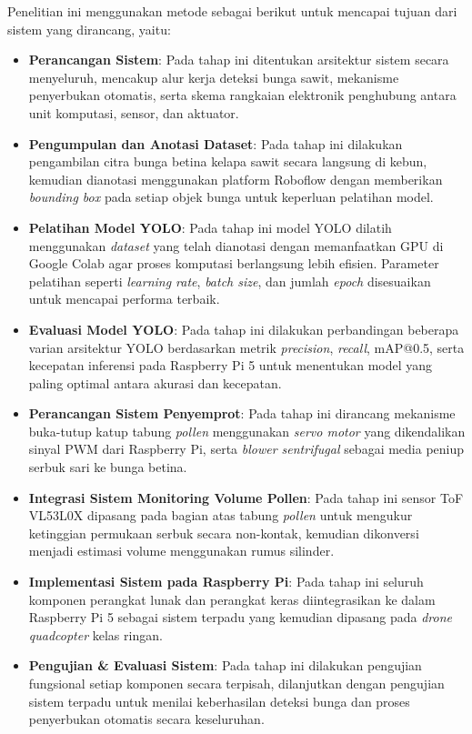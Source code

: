 Penelitian ini menggunakan metode sebagai berikut untuk mencapai tujuan dari sistem
yang dirancang, yaitu:
\begin{itemize}
    \item \textbf{Perancangan Sistem}: Pada tahap ini ditentukan arsitektur sistem secara menyeluruh, mencakup alur kerja deteksi bunga sawit, mekanisme penyerbukan otomatis, serta skema rangkaian elektronik penghubung antara unit komputasi, sensor, dan aktuator.
    \item \textbf{Pengumpulan dan Anotasi Dataset}: Pada tahap ini dilakukan pengambilan citra bunga betina kelapa sawit secara langsung di kebun, kemudian dianotasi menggunakan platform Roboflow dengan memberikan \emph{bounding box} pada setiap objek bunga untuk keperluan pelatihan model.
    \item \textbf{Pelatihan Model YOLO}: Pada tahap ini model YOLO dilatih menggunakan \emph{dataset} yang telah dianotasi dengan memanfaatkan GPU di Google Colab agar proses komputasi berlangsung lebih efisien. Parameter pelatihan seperti \emph{learning rate}, \emph{batch size}, dan jumlah \emph{epoch} disesuaikan untuk mencapai performa terbaik.
    \item \textbf{Evaluasi Model YOLO}: Pada tahap ini dilakukan perbandingan beberapa varian arsitektur YOLO berdasarkan metrik \emph{precision}, \emph{recall}, mAP@0.5, serta kecepatan inferensi pada Raspberry Pi 5 untuk menentukan model yang paling optimal antara akurasi dan kecepatan.
    \item \textbf{Perancangan Sistem Penyemprot}: Pada tahap ini dirancang mekanisme buka-tutup katup tabung \emph{pollen} menggunakan \emph{servo motor} yang dikendalikan sinyal PWM dari Raspberry Pi, serta \emph{blower sentrifugal} sebagai media peniup serbuk sari ke bunga betina.
    \item \textbf{Integrasi Sistem Monitoring Volume Pollen}: Pada tahap ini sensor ToF VL53L0X dipasang pada bagian atas tabung \emph{pollen} untuk mengukur ketinggian permukaan serbuk secara non-kontak, kemudian dikonversi menjadi estimasi volume menggunakan rumus silinder.
    \item \textbf{Implementasi Sistem pada Raspberry Pi}: Pada tahap ini seluruh komponen perangkat lunak dan perangkat keras diintegrasikan ke dalam Raspberry Pi 5 sebagai sistem terpadu yang kemudian dipasang pada \emph{drone quadcopter} kelas ringan.
    \item \textbf{Pengujian \& Evaluasi Sistem}: Pada tahap ini dilakukan pengujian fungsional setiap komponen secara terpisah, dilanjutkan dengan pengujian sistem terpadu untuk menilai keberhasilan deteksi bunga dan proses penyerbukan otomatis secara keseluruhan.
\end{itemize}

